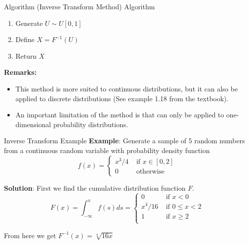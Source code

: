 \documentclass[8pt]{beamer}
\begin{document}
\begin{frame}{Algorithm (Inverse Transform Method)}
\alert{Algorithm}
\begin{enumerate}
\item Generate $U \sim U[0,1]$ 
\item Define $X=F^{-1}(U)$
\item Return $X$
\end{enumerate}

\textbf{Remarks:} 
\begin{itemize}
	\item This method is more suited to continuous distributions, but it can also be applied to discrete distributions (See example 1.18 from the textbook).
	\item An important limitation of the method is that can only be applied to one-dimensional probability distributions.
\end{itemize}
\end{frame}

\begin{frame}{Inverse Transform Example}
\textbf{Example}: Generate a sample of 5 random numbers from a continuous random variable with probability density function
\begin{equation*}
f(x)=\left\{ 
\begin{array}{ll} 
x^3/4  & \text { if } x \in [0,2]\\
 0 & \text{ otherwise} 
\end{array}
\right.
\end{equation*}

\pause

\textbf{Solution}: First we find the cumulative distribution function $F$.
\begin{equation*}
F(x)=\int_{-\infty}^x f(s)ds=
\left\{ 
\begin{array}{ll}
0 & \text{ if } x<0\\
x^4/16 & \text{ if } 0\leq x<2\\
1  & \text{ if } x \geq 2\\
\end{array}
\right.
\end{equation*}

From here we get $F^{-1}(x)=\sqrt[4]{16x}$
\end{frame}
\end{document}
